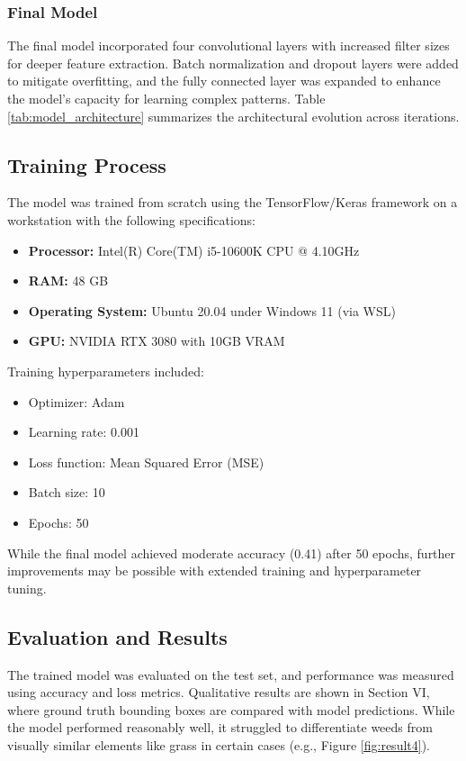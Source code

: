 \documentclass[conference]{IEEEtran}
\begin{document}
\subsubsection{Final Model}
The final model incorporated four convolutional layers with increased filter sizes for deeper feature extraction. Batch normalization and dropout layers were added to mitigate overfitting, and the fully connected layer was expanded to enhance the model's capacity for learning complex patterns. Table \ref{tab:model_architecture} summarizes the architectural evolution across iterations.

\subsection{Training Process}
The model was trained from scratch using the TensorFlow/Keras framework on a workstation with the following specifications:
\begin{itemize}
    \item \textbf{Processor:} Intel(R) Core(TM) i5-10600K CPU @ 4.10GHz
    \item \textbf{RAM:} 48 GB
    \item \textbf{Operating System:} Ubuntu 20.04 under Windows 11 (via WSL)
    \item \textbf{GPU:} NVIDIA RTX 3080 with 10GB VRAM
\end{itemize}

Training hyperparameters included:
\begin{itemize}
    \item Optimizer: Adam
    \item Learning rate: 0.001
    \item Loss function: Mean Squared Error (MSE)
    \item Batch size: 10
    \item Epochs: 50
\end{itemize}

While the final model achieved moderate accuracy (0.41) after 50 epochs, further improvements may be possible with extended training and hyperparameter tuning.

\subsection{Evaluation and Results}
The trained model was evaluated on the test set, and performance was measured using accuracy and loss metrics. Qualitative results are shown in Section VI, where ground truth bounding boxes are compared with model predictions. While the model performed reasonably well, it struggled to differentiate weeds from visually similar elements like grass in certain cases (e.g., Figure \ref{fig:result4}).
\end{document}

